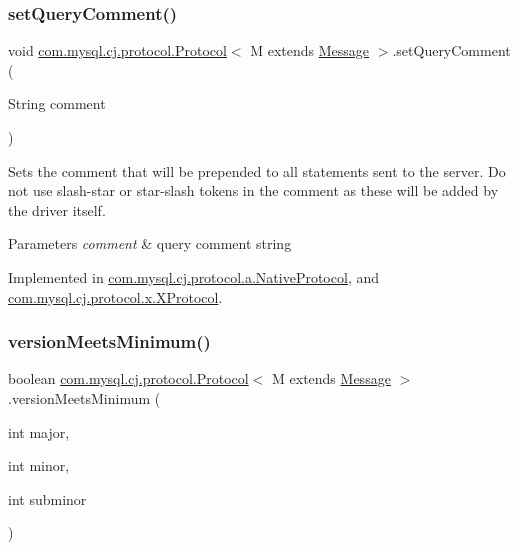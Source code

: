\subsubsection{\texorpdfstring{set\+Query\+Comment()}{setQueryComment()}}
{\footnotesize\ttfamily void \mbox{\hyperlink{interfacecom_1_1mysql_1_1cj_1_1protocol_1_1_protocol}{com.\+mysql.\+cj.\+protocol.\+Protocol}}$<$ M extends \mbox{\hyperlink{interfacecom_1_1mysql_1_1cj_1_1protocol_1_1_message}{Message}} $>$.set\+Query\+Comment (\begin{DoxyParamCaption}\item[{String}]{comment }\end{DoxyParamCaption})}

Sets the comment that will be prepended to all statements sent to the server. Do not use slash-\/star or star-\/slash tokens in the comment as these will be added by the driver itself.


\begin{DoxyParams}{Parameters}
{\em comment} & query comment string \\
\hline
\end{DoxyParams}


Implemented in \mbox{\hyperlink{classcom_1_1mysql_1_1cj_1_1protocol_1_1a_1_1_native_protocol_a31d74c4c65825a8c0b875831e4884f58}{com.\+mysql.\+cj.\+protocol.\+a.\+Native\+Protocol}}, and \mbox{\hyperlink{classcom_1_1mysql_1_1cj_1_1protocol_1_1x_1_1_x_protocol_ab009a2b06f09d53869c8983bed6c96b8}{com.\+mysql.\+cj.\+protocol.\+x.\+X\+Protocol}}.

\mbox{\label{interfacecom_1_1mysql_1_1cj_1_1protocol_1_1_protocol_ace7057295ed6873e77e7998bbf5fa082}} 
\subsubsection{\texorpdfstring{version\+Meets\+Minimum()}{versionMeetsMinimum()}}
{\footnotesize\ttfamily boolean \mbox{\hyperlink{interfacecom_1_1mysql_1_1cj_1_1protocol_1_1_protocol}{com.\+mysql.\+cj.\+protocol.\+Protocol}}$<$ M extends \mbox{\hyperlink{interfacecom_1_1mysql_1_1cj_1_1protocol_1_1_message}{Message}} $>$.version\+Meets\+Minimum (\begin{DoxyParamCaption}\item[{int}]{major,  }\item[{int}]{minor,  }\item[{int}]{subminor }\end{DoxyParamCaption})}



